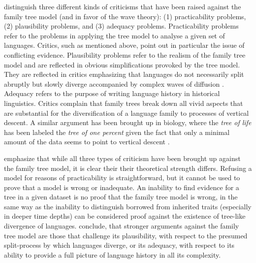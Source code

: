 \documentclass[svgnames,12pt]{scrartcl}
\begin{document}
{\citet[118-120]{Geisler2013} distinguish three different kinds of
criticisms that have been raised against the family tree model (and in favor of the wave theory): (1)
practicability problems, (2) plausibility problems, and (3) adequacy problems. Practicability
problems refer to the problems in applying the tree model to analyse a given set of languages. 
Critics, such as \citet{Schmidt1872} mentioned above, point out in particular the issue of
conflicting evidence.
Plausibility problems refer to the realism of the family tree model and
are reflected in obvious simplifications provoked by the tree model. They are reflected in critics
emphasizing that languages do not necessarily split abruptly but slowly diverge accompanied by
complex waves of diffusion \citep{Schuchardt1870,Schmidt1872}. 
Adequacy refers to the purpose of
writing language history in historical linguistics. Critics complain that family trees break down
all vivid aspects that are substantial for the diversification of a language family to processes of
vertical descent. A similar argument has been brought up in biology, where the \emph{tree of life}
has been labeled the \emph{tree of one percent} given the fact that only a minimal amount of the
data seems to point to vertical descent \citep{Dagan2006}.
 
\citet{Geisler2013} emphasize that while all three types of criticism have been brought up against
the family tree model, it is clear their their theoretical strength differs. Refusing a model for
reasons of practicability is straightforward, but it cannot be used to prove that a model is wrong or
inadequate.  An inability to find evidence for a tree in a given dataset is no proof that the
family tree model is wrong, in the same way as the inability to distinguish borrowed from inherited
traits (especially in deeper time depths) can be considered proof against the existence of
tree-like divergence of languages.  \citet{Geisler2013} conclude, that stronger arguments against
the family tree model are those that challenge its plausibility, with respect to the presumed
split-process by which languages diverge, or its adequacy, with respect to its ability to provide a
full picture of language history in all its complexity.
 
}
\end{document}
